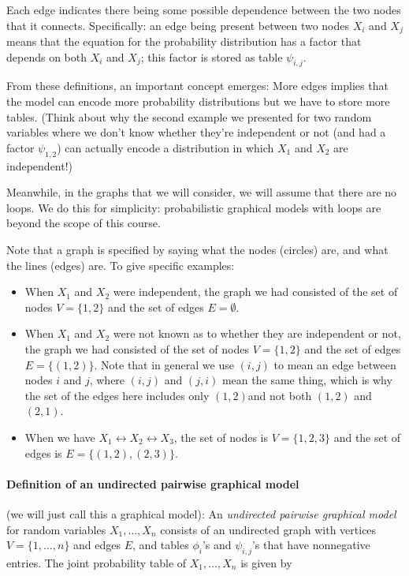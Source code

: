 \documentclass[6008notes.tex]{subfiles}
\begin{document}
Each edge indicates there being some possible dependence between the two nodes that it connects. Specifically: an edge being present between two nodes $X_i$ and $X_j$ means that the equation for the probability distribution has a factor that depends on both $X_i$ and $X_j$; this factor is stored as table $\psi_{i, j}$.

From these definitions, an important concept emerges: More edges implies that the model can encode more probability distributions but we have to store more tables. (Think about why the second example we presented for two random variables where we don't know whether they're independent or not (and had a factor $\psi_{1, 2}$) can actually encode a distribution in which $X_1$ and $X_2$ are independent!)

Meanwhile, in the graphs that we will consider, we will assume that there are no loops. We do this for simplicity: probabilistic graphical models with loops are beyond the scope of this course.

Note that a graph is specified by saying what the nodes (circles) are, and what the lines (edges) are. To give specific examples:

\begin{itemize}
\item When $X_1$ and $X_2$ were independent, the graph we had consisted of the set of nodes $V=\{ 1, 2\}$ and the set of edges $E=\emptyset$.

\item When $X_1$ and $X_2$ were not known as to whether they are independent or not, the graph we had consisted of the set of nodes $V=\{ 1, 2\}$ and the set of edges $E=\{(1,2)\}$. Note that in general we use $(i,j)$ to mean an edge between nodes $i$ and $j$, where $(i,j)$ and $(j,i)$ mean the same thing, which is why the set of the edges here includes only $(1,2)$and not both $(1,2)$ and $(2,1)$.

\item When we have $X_1 \leftrightarrow X_2 \leftrightarrow X_3$, the set of nodes is $V=\{1,2,3\}$ and the set of edges is $E=\{(1,2),(2,3)\}$.
\end{itemize}

\paragraph{Definition of an undirected pairwise graphical model} (we will just call this a graphical model): An \textit{undirected pairwise graphical model} for random variables $X_1, \dots , X_n$ consists of an undirected graph with vertices $V=\{1, \dots ,n\}$ and edges $E$, and tables $\phi_i$'s and $\psi_{i, j}$'s that have nonnegative entries. The joint probability table of $X_1, \dots , X_n$ is given by
\end{document}
